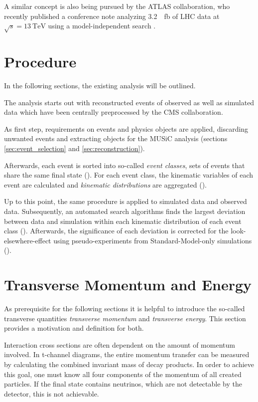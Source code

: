 A similar concept is also being pursued by the \ac{ATLAS} collaboration, who recently published a conference note analyzing \SI{3.2}{\per\femto\barn} of \ac{LHC} data at $\sqrt{s} = \SI{13}{\TeV}$ using a model-independent search \cite{ATLAS:ATLAS-CONF-2017-001}. 

\section{Procedure}
In the following sections, the existing analysis will be outlined.

The analysis starts out with reconstructed events of observed as well as simulated data which have been centrally preprocessed by the \ac{CMS} collaboration.

As first step, requirements on events and physics objects are applied, discarding unwanted events and extracting objects for the \ac{MUSiC} analysis (sections \ref{sec:event_selection} and \ref{sec:reconstruction}).

Afterwards, each event is sorted into so-called \emph{event classes}, sets of events that share the same final state ().
For each event class, the kinematic variables of each event are calculated and \emph{kinematic distributions} are aggregated ().

Up to this point, the same procedure is applied to simulated data and observed data.
Subsequently, an automated search algorithms finds the largest deviation between data and simulation within each kinematic distribution of each event class (). Afterwards, the significance of each deviation is corrected for the look-elsewhere-effect using pseudo-experiments from Standard-Model-only simulations ().

\section{Transverse Momentum and Energy}
\label{sec:transverse_quantities}

As prerequisite for the following sections it is helpful to introduce the so-called transverse quantities \emph{transverse momentum} and \emph{transverse energy}. This section provides a motivation and definition for both.

Interaction cross sections are often dependent on the amount of momentum involved. In t-channel diagrams, the entire momentum transfer can be measured by calculating the combined invariant mass of decay products.
In order to achieve this goal, one must know all four components of the momentum of all created particles. If the final state contains neutrinos, which are not detectable by the detector, this is not achievable.

